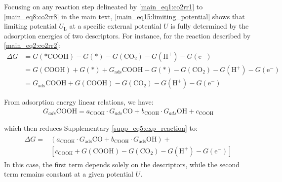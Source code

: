 Focusing on any reaction step delineated by \cref{main_eq1:co2rr1} to \cref{main_eq8:co2rr8} in the main text,
\cref{main_eq15:limiting_potential} shows that limiting potential $U_{\mathrm{L}}$ at a specific external potential $U$ is fully determined by the adsorption energies of two descriptors.
For instance, for the reaction described by \cref{main_eq2:co2rr2}:
\begin{align}
  \Delta G &= G(\text{*COOH}) - G(\text{*}) - G(\text{CO}_2) - G(\text{H}^+) - G(\text{e}^-)  \\
  &= G(\text{COOH}) + G(\text{*}) + G_{\text{ads}}\text{COOH} -
  G(\text{*}) - G(\text{CO}_2) -G(\text{H}^+) - G(\text{e}^-) \\
  &= G_{\text{ads}}\text{COOH} + G(\text{COOH}) - G(\text{CO}_2) -G(\text{H}^+) - G(\text{e}^-)  \label{supp_eq5:exp_reaction}
\end{align}

From adsorption energy linear relations, we have:
\begin{align}
  G_{ads}{\mathrm{COOH}} = a_{\text{COOH}} \cdot G_{ads}{\mathrm{CO}} +
  b_{\text{COOH}} \cdot G_{ads}{\mathrm{OH}} + c_{\text{COOH}}  \label{supp_eq6:eads}
\end{align}

which then reduces Supplementary \cref{supp_eq5:exp_reaction} to:
\begin{align}
  \begin{split}
    \Delta G = &(a_{\text{COOH}} \cdot G_{\text{ads}}{\mathrm{CO}} +
    b_{\text{COOH}} \cdot G_{\text{ads}}{\mathrm{OH}}) + \\
    &[c_{\text{COOH}} + G(\mathrm{COOH}) -
    G(\mathrm{CO}_2) - G(\mathrm{H}^+) - G(\mathrm{e}^-)]  \label{supp_eq7:reduced_eads}
  \end{split}
\end{align}
In this case, the first term depends solely on the descriptors, while the second term remains constant at a given potential $U$.

